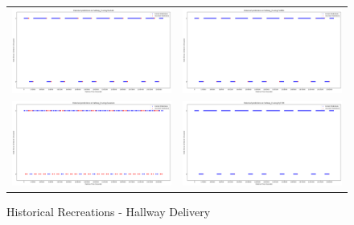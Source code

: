 \begin{figure}
  \begin{tabular}{cc}
    {\includegraphics[width = 3in]{images/results/Historical_hallway_D_Duckett.png}} &
    {\includegraphics[width = 3in]{images/results/Historical_hallway_D_FreMEn.png}} \\
    {\includegraphics[width = 3in]{images/results/Historical_hallway_D_Gaussian.png}} &
    {\includegraphics[width = 3in]{images/results/Historical_hallway_D_HyT-EM.png}} \\
  \end{tabular}
  \caption{Historical Recreations - Hallway Delivery}
\end{figure}\\ \\

